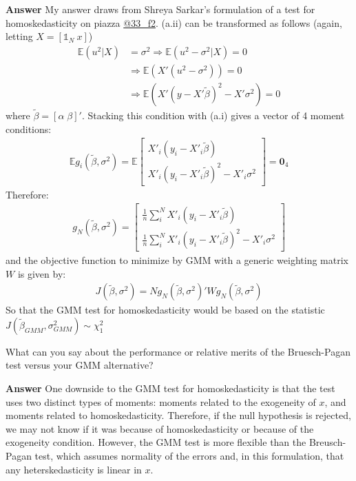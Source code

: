 \documentclass[11pt]{exam}
\begin{document}
\begin{questions}
\textbf{Answer} My answer draws from Shreya Sarkar's formulation of a
test for homoskedasticity on piazza \href{https://piazza.com/class/km9z4xiuham24j?cid=33\_f2}{@33\_f2}.
(a.ii) can be transformed as follows (again, letting $X = [\mathbb{1}_N\: x]$)
\begin{align*}
\mathbb{E}(u^2|X) &= \sigma^2 \Rightarrow \mathbb{E}(u^2 - \sigma^2 | X) = 0\\
&\Rightarrow \mathbb{E}(X'(u^2 - \sigma^2)) = 0 \\
&\Rightarrow \mathbb{E}(X'(y - X'\tilde{\beta})^2 - X'\sigma^2) = 0
\end{align*}
where \(\tilde{\beta} = [\alpha\; \beta]'\). Stacking this condition
with (a.i) gives a vector of 4 moment conditions:
\begin{align*}
\mathbb{E}g_i(\tilde{\beta}, \sigma^2) = \mathbb{E}\begin{bmatrix} X'_i(y_i - X'_i\tilde{\beta}) \\ X'_i(y_i - X'_i\tilde{\beta})^2 - X'_i\sigma^2 \end{bmatrix} = \mathbf{0}_4
\end{align*}
Therefore:
\begin{align*}
g_N(\tilde{\beta}, \sigma^2) = \begin{bmatrix} \frac{1}{n}\sum_i^N X'_i(y_i - X'_i\tilde{\beta}) \\ \frac{1}{n}\sum_i^NX'_i(y_i - X'_i\tilde{\beta})^2 - X'_i\sigma^2 \end{bmatrix}
\end{align*}
and the objective function to minimize by GMM with a generic weighting
matrix \(W\) is given by:
\begin{align*}
J(\tilde{\beta}, \sigma^2) = Ng_N(\tilde{\beta}, \sigma^2)'Wg_N(\tilde{\beta}, \sigma^2)
\end{align*}
So that the GMM test for homoskedasticity would be based on the
statistic \(J(\tilde{\beta}_{GMM}, \sigma^2_{GMM})\sim \chi^2_{1}\)

    \question What can you say about the performance or relative merits
of the Bruesch-Pagan test versus your GMM alternative?

\textbf{Answer} One downside to the GMM test for homoskedasticity is
that the test uses two distinct types of moments: moments related to the
exogeneity of \(x\), and moments related to homoskedasticity. Therefore,
if the null hypothesis is rejected, we may not know if it was because of
homoskedasticity or because of the exogeneity condition. However, the
GMM test is more flexible than the Breusch-Pagan test, which assumes
normality of the errors and, in this formulation, that any
heterskedasticity is linear in \(x\).


\end{questions}
\end{document}
